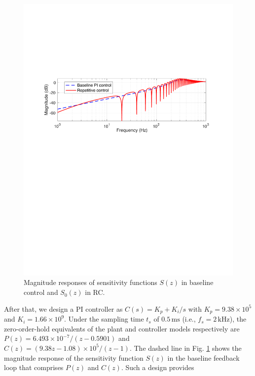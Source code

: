 \documentclass [11pt, proquest] {uwthesis}[2020/02/24]
\begin{document}
\begin{figure}[!ht]
\begin{centering}
\includegraphics[clip,width=13cm]{Closed-loop-simulation/Sensitivity_func_baseline_rc}
\par\end{centering}
\centering{}\caption{\label{fig:Magnitude-responses-of-3}Magnitude responses of sensitivity
functions $S(z)$ in baseline control and $S_{0}(z)$ in RC.}
\end{figure}
After that, we design a PI controller as $C(s)=K_{p}+K_{i}/s$ with
$K_{p}=9.38\times10^{5}$ and $K_{i}=1.66\times10^{9}$. Under the
sampling time $t_{s}$ of $0.5\,\text{ms}$ (i.e., $f_{s}=2\,\text{kHz}$),
the zero-order-hold equivalents of the plant and controller models
respectively are $P(z)=6.493\times10^{-7}/(z-0.5901)$ and $C(z)=(9.38z-1.08)\times10^{5}/(z-1)$.
The dashed line in Fig. \ref{fig:Magnitude-responses-of-3} shows the
magnitude response of the sensitivity function $S(z)$ in the baseline
feedback loop that comprises $P(z)$ and $C(z)$. Such a design provides
\end{document}
